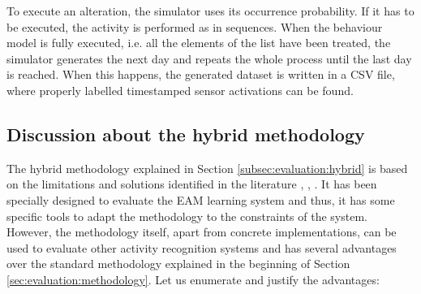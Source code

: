 To execute an alteration, the simulator uses its occurrence probability. If it has to be executed, the activity is performed as in sequences. When the behaviour model is fully executed, i.e. all the elements of the list have been treated, the simulator generates the next day and repeats the whole process until the last day is reached. When this happens, the generated dataset is written in a CSV file, where properly labelled timestamped sensor activations can be found.

\subsection{Discussion about the hybrid methodology}
\label{subsec:evaluation:hybrid:discussion}
\begin{comment}
- Explain the advantages: generate virtually infinite datasets, arbitrary number of days, perfectly labelled, sensor noise, erratic behaviour, realistic time lapses
 - Explain the main disadvantages: erratic behaviour difficult to capture
 \end{comment}
The hybrid methodology explained in Section \ref{subsec:evaluation:hybrid} is based on the limitations and solutions identified in the literature \cite{Helal2011}, \cite{Helal2012}, \cite{Okeyo2012a}. It has been specially designed to evaluate the EAM learning system and thus, it has some specific tools to adapt the methodology to the constraints of the system. However, the methodology itself, apart from concrete implementations, can be used to evaluate other activity recognition systems and has several advantages over the standard methodology explained in the beginning of Section \ref{sec:evaluation:methodology}. Let us enumerate and justify the advantages:

